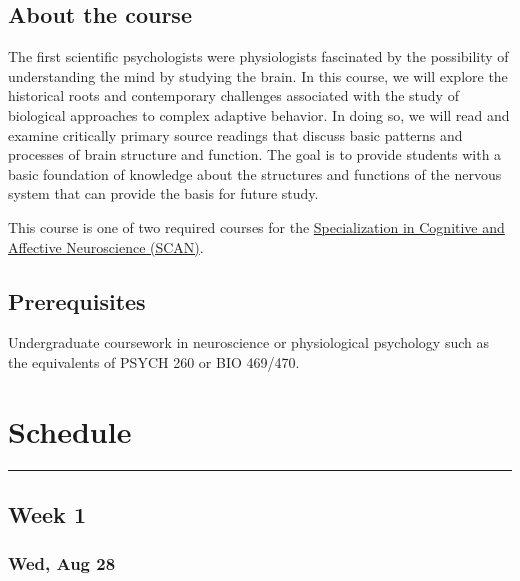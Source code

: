 \documentclass[]{article}
\begin{document}
\hypertarget{about-the-course}{%
\subsection{About the course}\label{about-the-course}}

The first scientific psychologists were physiologists fascinated by the
possibility of understanding the mind by studying the brain. In this
course, we will explore the historical roots and contemporary challenges
associated with the study of biological approaches to complex adaptive
behavior. In doing so, we will read and examine critically primary
source readings that discuss basic patterns and processes of brain
structure and function. The goal is to provide students with a basic
foundation of knowledge about the structures and functions of the
nervous system that can provide the basis for future study.

This course is one of two required courses for the
\href{http://psych.la.psu.edu/graduate/program-areas/cross-cutting-program-initiatives/specialization-in-cognitive-and-affective-neuroscience/specialization-in-cognitive-and-affective-neuroscience}{Specialization
in Cognitive and Affective Neuroscience (SCAN)}.

\hypertarget{prerequisites}{%
\subsection{Prerequisites}\label{prerequisites}}

Undergraduate coursework in neuroscience or physiological psychology
such as the equivalents of PSYCH 260 or BIO 469/470.

\hypertarget{schedule}{%
\section{Schedule}\label{schedule}}

\begin{center}\rule{0.5\linewidth}{\linethickness}\end{center}

\hypertarget{week-1}{%
\subsection{Week 1}\label{week-1}}

\hypertarget{wed-aug-28}{%
\subsubsection{Wed, Aug 28}\label{wed-aug-28}}
\end{document}
